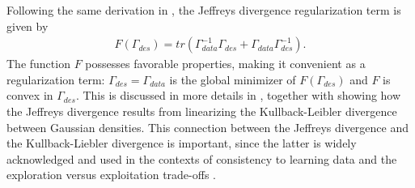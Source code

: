 \documentclass[letterpaper, 10 pt, conference]{ieeeconf}
\newcommand{\trace}{\textit{tr}}
\begin{document}
Following the same derivation in \cite[Lemma~1 and the subsequent discussion]{ramadan2024data}, the Jeffreys divergence regularization term is given by
\begin{align}
    F(\Gamma_{des}) = \trace \left ( \Gamma_{data}^{-1}\Gamma_{des} + \Gamma_{data}\Gamma_{des}^{-1}\right). \label{eq:F}
\end{align}
The function $F$ possesses favorable properties, making it convenient as a regularization term: $\Gamma_{des} = \Gamma_{data}$ is the global minimizer of $F(\Gamma_{des})$ and $F$ is convex in $\Gamma_{des}$. This is discussed in more details in \cite{ramadan2024data}, together with showing how the Jeffreys divergence results from linearizing the Kullback-Leibler divergence between Gaussian densities. This connection between the Jeffreys divergence and the Kullback-Liebler divergence is important, since the latter is widely acknowledged and used in the contexts of consistency to learning data and the exploration versus exploitation trade-offs \cite{schulman2017proximal}.
\end{document}
